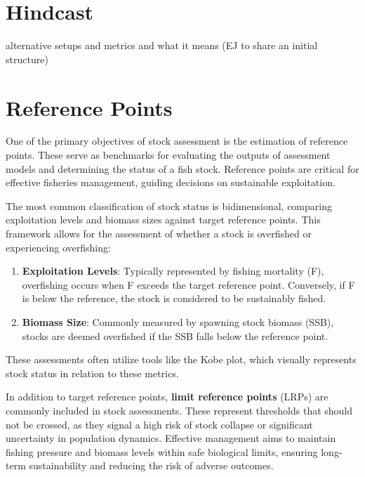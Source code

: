 \documentclass[
]{book}
\begin{document}
\hypertarget{hindcast}{%
\chapter{Hindcast}\label{hindcast}}

alternative setups and metrics and what it means (EJ to share an initial structure)

\hypertarget{reference-points}{%
\chapter{Reference Points}\label{reference-points}}

One of the primary objectives of stock assessment is the estimation of reference points. These serve as benchmarks for evaluating the outputs of assessment models and determining the status of a fish stock. Reference points are critical for effective fisheries management, guiding decisions on sustainable exploitation.

The most common classification of stock status is bidimensional, comparing exploitation levels and biomass sizes against target reference points. This framework allows for the assessment of whether a stock is overfished or experiencing overfishing:

\begin{enumerate}
\def\labelenumi{\arabic{enumi}.}
\item
  \textbf{Exploitation Levels}: Typically represented by fishing mortality (F), overfishing occurs when F exceeds the target reference point. Conversely, if F is below the reference, the stock is considered to be sustainably fished.
\item
  \textbf{Biomass Size}: Commonly measured by spawning stock biomass (SSB), stocks are deemed overfished if the SSB falls below the reference point.
\end{enumerate}

These assessments often utilize tools like the Kobe plot, which visually represents stock status in relation to these metrics.

In addition to target reference points, \textbf{limit reference points} (LRPs) are commonly included in stock assessments. These represent thresholds that should not be crossed, as they signal a high risk of stock collapse or significant uncertainty in population dynamics. Effective management aims to maintain fishing pressure and biomass levels within safe biological limits, ensuring long-term sustainability and reducing the risk of adverse outcomes.
\end{document}

